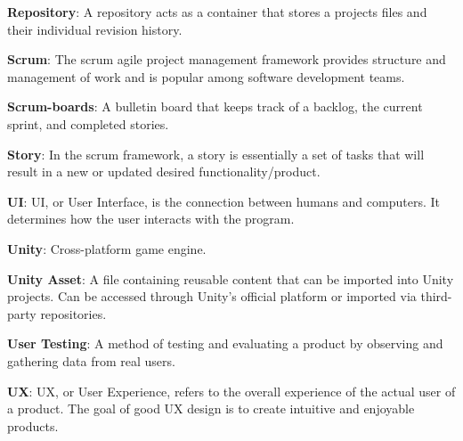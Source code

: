 \noindent
\label{itm:repository}\textbf{Repository}: A repository acts as a container that stores a projects files and their individual revision history. 

\noindent
\label{itm:scrum}\textbf{Scrum}: The scrum agile project management framework provides structure and management of work and is popular among software development teams.

\noindent 
\label{itm:scrum-boards}\textbf{Scrum-boards}: A bulletin board that keeps track of a backlog, the current sprint, and completed stories.

\noindent
\label{itm:story}\textbf{Story}: In the scrum framework, a story is essentially a set of tasks that will result in a new or updated desired functionality/product.  

\noindent
\label{itm:ui}\textbf{UI}: UI, or User Interface, is the connection between humans and computers. It determines how the user interacts with the program.

\noindent
\label{itm:unity}\textbf{Unity}: Cross-platform game engine.

\noindent
\label{itm:unity-asset}\textbf{Unity Asset}: A file  containing reusable content that can be imported into Unity projects. Can be accessed through Unity's official platform or imported via third-party repositories. 

\noindent
\label{itm:user-testing}\textbf{User Testing}: A method of testing and evaluating a product by observing and gathering data from real users. 

\noindent
\label{itm:ux}\textbf{UX}: UX, or User Experience, refers to the overall experience of the actual user of a product. The goal of good UX design is to create intuitive and enjoyable products.


